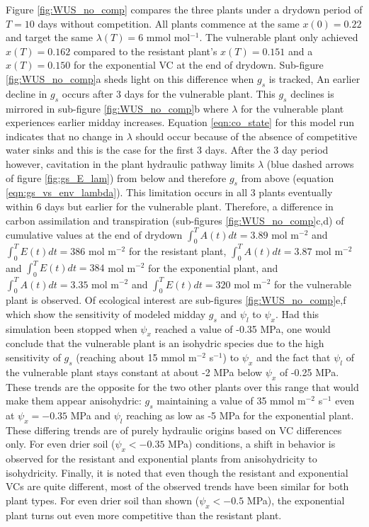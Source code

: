 \documentclass[utf8]{frontiersSCNS} %
\begin{document}
Figure \ref{fig:WUS_no_comp} compares the three plants under a drydown period of $T=10$ days without competition. All plants commence at the same $x(0)=0.22$ and target the same $\lambda(T)=$6 mmol mol$^{-1}$. The vulnerable plant only achieved $x(T)=0.162$ compared to the resistant plant's $x(T)=0.151$ and a $x(T)=0.150$ for the exponential VC at the end of drydown. Sub-figure \ref{fig:WUS_no_comp}a sheds light on this difference when $g_s$ is tracked, An earlier decline in $g_s$ occurs after 3 days for the vulnerable plant. This $g_s$ declines is mirrored in sub-figure \ref{fig:WUS_no_comp}b where $\lambda$ for the vulnerable plant experiences earlier midday increases. Equation \ref{eqn:co_state} for this model run indicates that no change in $\lambda$ should occur because of the absence of competitive water sinks and this is the case for the first 3 days. After the 3 day period however, cavitation in the plant hydraulic pathway limits $\lambda$ (blue dashed arrows of figure \ref{fig:gs_E_lam}) from below and therefore $g_s$ from above (equation \ref{eqn:gs_vs_env_lambda}). This limitation occurs in all 3 plants eventually within 6 days but earlier for the vulnerable plant. Therefore, a difference in carbon assimilation and transpiration (sub-figures \ref{fig:WUS_no_comp}c,d) of cumulative values at the end of drydown $\int_0^TA(t)dt= 3.89$ mol m$^{-2}$ and $\int_0^TE(t)dt= 386$ mol m$^{-2}$ for the resistant plant, $\int_0^TA(t)dt= 3.87$ mol m$^{-2}$ and $\int_0^TE(t)dt= 384$ mol m$^{-2}$ for the exponential plant, and $\int_0^TA(t)dt= 3.35$ mol m$^{-2}$ and $\int_0^TE(t)dt= 320$ mol m$^{-2}$ for the vulnerable plant is observed. Of ecological interest are sub-figures \ref{fig:WUS_no_comp}e,f which show the sensitivity of modeled midday $g_s$ and $\psi_l$ to $\psi_x$. Had this simulation been stopped when $\psi_x$ reached a value of -0.35 MPa, one would conclude that the vulnerable plant is an isohydric species due to the high sensitivity of $g_s$ (reaching about 15 mmol m$^{-2}$ s$^{-1}$) to $\psi_x$ and the fact that $\psi_l$ of the vulnerable plant stays constant at about -2 MPa below $\psi_x$ of -0.25 MPa. These trends are the opposite for the two other plants over this range that would make them appear anisohydric: $g_s$ maintaining a value of 35 mmol m$^{-2}$ s$^{-1}$ even at $\psi_x = -0.35$ MPa and $\psi_l$ reaching as low as -5 MPa for the exponential plant. These differing trends are of purely hydraulic origins based on VC differences only. For even drier soil ($\psi_x < -0.35$ MPa) conditions, a shift in behavior is observed for the resistant and exponential plants from anisohydricity to isohydricity. Finally, it is noted that even though the resistant and exponential VCs are quite different, most of the observed trends have been similar for both plant types. For even drier soil than shown ($\psi_x < -0.5$ MPa), the exponential plant turns out even more competitive than the resistant plant.
\end{document}

